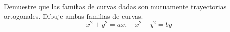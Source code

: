 \item Demuestre que las familias de curvas dadas son mutuamente trayectorias ortogonales. Dibuje ambas familias de curvas.
$$x^2 + y^2 = ax, \quad x^2 + y^2 = by$$
